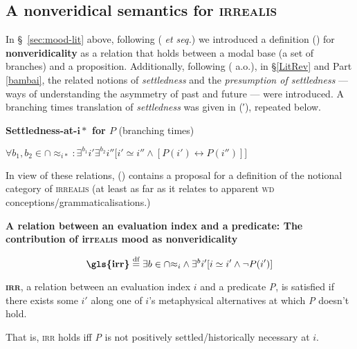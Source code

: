 \subsection{A nonveridical semantics for \textsc{irrealis}}

In \S~\ref{sec:mood-lit} above, following \citeauthor{Giannakidou1995} (\citeyear{Giannakidou1995,Giannakidou1998} \textit{et seq.}) we introduced a definition () for \textbf{nonveridicality} as a relation that holds between a modal base (a set of branches) and a proposition. Additionally, following (\citealt*{Condoravdi2002,Kaufmann2005,Kaufmann2006} a.o.), in \S\ref{LitRev} and Part \ref{bambai}, the related notions of \textit{settledness} and the \textit{presumption of settledness} --- ways of understanding the asymmetry of past and future --- were introduced. A branching times translation of \textit{settledness} was given in (′), repeated below.


\pex\textbf{Settledness-at-$ \boldsymbol{i*} $ for $ \boldsymbol{\mathit P} $} (branching times)

\nobreak$\forall b_1,b_2\in\cap{\approx_{i*}}:\exists^{b_1}i'\exists^{b_2}i''\big[i'\simeq i''\wedge [P(i')\leftrightarrow P(i'')]\big]$
%

\xe

In view of these relations, (\nextx) contains a proposal for a definition of the notional category of \textsc{irrealis} (at least as far as it relates to apparent \textsc{wd} conceptions\slash{}grammatical\-isations.)


\ex \textbf{A relation between an evaluation index and a predicate: The contribution of \gls{irr}\textsc{ealis} mood as nonveridicality}


$$ \textbf{\gls{irr}}\overset{\text{df}}{=} \exists b\in\cap{\approx_i}\wedge\exists^b i'[i\simeq i'\wedge\neg P(i')] $$

\textbf{\textsc{irr}}, a relation between an evaluation index $ i $ and a predicate \textit{P}, is satisfied if there exists some $ i' $ along one of $ i $'s metaphysical alternatives at which \textit{P} doesn't hold.

That is, \textsc{irr} holds iff \textit{P} is not positively settled/historically necessary at $ i $.

